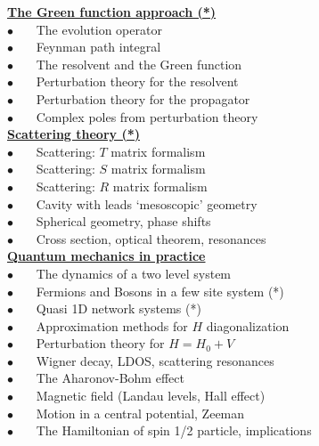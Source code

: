 \documentclass[onecolumn,fleqn]{revtex4}
\newcommand{\bitem}{$\bullet$ \ \ \ }
\newcommand{\mpgt}[2][1.0\hsize]{\begin{minipage}[t]{#1}{#2}\end{minipage}}
\begin{document}
\mpgt[0.48\hsize]{


\hyperlink{shdA5.1}{\bf The Green function approach (*)} \\

\bitem The evolution operator  \\ 
\bitem Feynman path integral  \\
\bitem The resolvent and the Green function  \\ 

\bitem Perturbation theory for the resolvent  \\
\bitem Perturbation theory for the propagator  \\
\bitem Complex poles from perturbation theory  \\ 



\hyperlink{shdA6.1}{\bf Scattering theory (*)} \\

\bitem Scattering: $T$ matrix formalism  \\
\bitem Scattering: $S$ matrix formalism  \\
\bitem Scattering: $R$ matrix formalism  \\
\bitem Cavity with leads `mesoscopic' geometry \\ 
\bitem Spherical geometry, phase shifts  \\ 
\bitem Cross section, optical theorem, resonances \\



\hyperlink{shdA7.1}{\bf Quantum mechanics in practice} \\

\bitem The dynamics of a two level system \\
\bitem Fermions and Bosons in a few site system (*) \\
\bitem Quasi 1D network systems (*) \\

\bitem Approximation methods for $H$ diagonalization \\ 
\bitem Perturbation theory for $H=H_0+V$ \\
\bitem Wigner decay, LDOS, scattering resonances \\

\bitem The Aharonov-Bohm effect \\
\bitem Magnetic field (Landau levels, Hall effect) \\
\bitem Motion in a central potential, Zeeman \\
\bitem The Hamiltonian of spin 1/2 particle, implications \\



}
\end{document}
